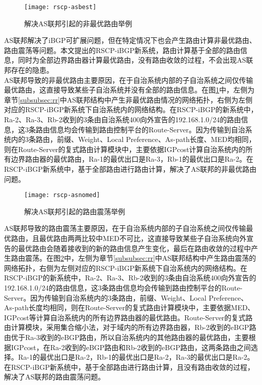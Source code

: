 \begin{figure}
  \centering
  \texttt{[image: rscp-asbest]}
  \caption{解决AS联邦引起的非最优路由举例}
  \label{fig:rscp-asbest}
\end{figure}

AS联邦解决了iBGP可扩展问题，但在特定情况下也会产生路由计算非最优路由、路由震荡等问题。本文提出的RSCP-iBGP新系统，路由计算基于全部的路由信息，同时为全部边界路由器计算最优路由，没有路由收敛的过程，不会出现AS联邦存在的隐患。\\

AS联邦导致的非最优路由主要原因，在于自治系统内部的子自治系统之间仅传输最优路由，这直接导致某些子自治系统并没有全部的路由信息。在图\ref{fig:rscp-asbest}中，左侧为章节\ref{subsubsec:rr}中AS联邦结构中产生非最优路由情况的网络拓扑，右侧为左侧对应的RSCP-iBGP新系统下自治系统内的网络结构。在RSCP-iBGP的新系统中，Ra-2、Ra-3、Rb-2收到的3条由自治系统400向外宣告的192.168.1.0/24的路由信息，这3条路由信息均会传输到路由控制平台的Route-Server。因为传输到自治系统内的3条路由，前缀、Weight、Local Preference、As-path长度、MED均相同，则在Route-Server的复式路由计算模块中，主要依据IGPcost计算自治系统内的所有边界路由器的最优路由，Ra-1的最优出口是Ra-3，Rb-1的最优出口是Ra-2。在RSCP-iBGP新系统中，基于全部路由进行路由计算，解决了AS联邦的非最优路由问题。\\




\begin{figure}
  \centering
  \texttt{[image: rscp-asnomed]}
  \caption{解决AS联邦引起的路由震荡举例}
  \label{fig:rscp-asnomed}
\end{figure}


AS联邦导致的路由震荡主要原因，在于自治系统内部的子自治系统之间仅传输最优路由，且最优路由两两比较中MED不可比，这直接导致某些子自治系统向外宣告的最优路由会随着接收到的新的路由信息产生变化，最后在路由收敛的过程中产生路由震荡。在图\ref{fig:rscp-asnomed}中，左侧为章节\ref{subsubsec:rr}中AS联邦结构中产生路由震荡的网络拓扑，右侧为左侧对应的RSCP-iBGP新系统下自治系统内的网络结构。在RSCP-iBGP的新系统中，Ra-2、Ra-3、Rb-2收到的3条由自治系统400向外宣告的192.168.1.0/24的路由信息，这3条路由信息均会传输到路由控制平台的Route-Server。因为传输到自治系统内的3条路由，前缀、Weight、Local Preference、As-path长度均相同，则在Route-Server的复式路由计算模块中，主要依据MED、IGPcost等计算自治系统内的所有边界路由器的最优路由。Route-Server的复式路由计算模块，采用集合缩小法，对于域内的所有边界路由器，Rb-2收到的eBGP路由优于Ra-3收到的eBGP路由，所以自治系统内的其他路由器的最优路由，主要根据IGPcost，在Ra-2收到的eBGP路由和Rb-2收到的eBGP路由，这两条路由之间选择。Ra-1的最优出口是Ra-2，Rb-1的最优出口是Ra-2，Ra-3的最优出口是Ra-2。在RSCP-iBGP新系统中，基于全部路由进行路由计算，且没有路由收敛的过程，解决了AS联邦的路由震荡问题。

